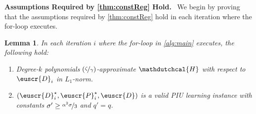 \documentclass[11pt]{article}
\theoremstyle{plain}
\newtheorem{lemma}[theorem]{Lemma}
\theoremstyle{definition}
\theoremstyle{remark}
\newcommand{\nfrac}[2]{\nicefrac{#1}{#2}}
\newcommand{\customcal}[1]{\euscr{#1}}
\newcommand{\cD}{\customcal{D}}
\newcommand{\cP}{\customcal{P}}
\renewcommand{\paragraph}[1]{\medskip \noindent\textbf{#1}~}
\newcommand{\hypo}[1]{\mathdutchcal{#1}}
\newcommand{\hyH}{\hypo{H}}
\newcommand{\cDtrue}{\cD^\star}
\newcommand{\cDgiven}{\cD}
\newcommand{\cPtrue}{\cP^\star}
\newcommand{\nL}{L}
\begin{document}
        \paragraph{Assumptions Required by \cref{thm:constReg} Hold.}
            We begin by proving that the assumptions required by \cref{thm:constReg} hold in each iteration where the for-loop executes.
            \begin{lemma}
                \label{lem:main:assumptions}
                In each iteration $i$ where the for-loop in \cref{alg:main} executes, the following hold:
                \begin{enumerate}
                    \item Degree-$k$ polynomials $(\nfrac{\zeta}{\gamma})$-approximate $\hyH$ with respect to  $\cDgiven_i$ in $\nL_1$-norm. %
                    \item $(\cDtrue_i,\cPtrue_i,\cDgiven)$ is a valid PIU learning instance with constants $\sigma'\geq \nfrac{\alpha^2 \sigma}{3}$ and $q'=q$.
                \end{enumerate}
            \end{lemma}
\end{document}
